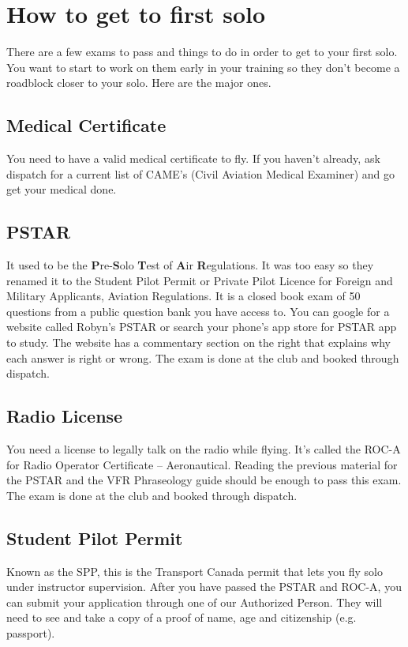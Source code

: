 \documentclass[12pt,letterpaper]{article}
\begin{document}
 \newpage
 \section{How to get to first solo}
    
    There are a few exams to pass and things to do in order to get to your first solo. You want to start to work on them early in your training so they don't become a roadblock closer to your solo. Here are the major ones.
    
    \subsection{Medical Certificate}
    You need to have a valid medical certificate to fly. If you haven't already, ask dispatch for a current list of CAME's (Civil Aviation Medical Examiner) and go get your medical done.
        
    \subsection{PSTAR}
    It used to be the \textbf{P}re-\textbf{S}olo \textbf{T}est of \textbf{A}ir \textbf{R}egulations. It was too easy so they renamed it to the Student Pilot Permit or Private Pilot Licence for Foreign and Military Applicants, Aviation Regulations. It is a closed book exam of 50 questions from a public question bank you have access to. You can google for a website called Robyn's PSTAR or search your phone's app store for PSTAR app to study. The website has a commentary section on the right that explains why each answer is right or wrong. The exam is done at the club and booked through dispatch.
        
    \subsection{Radio License}
    You need a license to legally talk on the radio while flying. It's called the ROC-A for Radio Operator Certificate -- Aeronautical. Reading the previous material for the PSTAR and the VFR Phraseology guide should be enough to pass this exam. The exam is done at the club and booked through dispatch.

    \subsection{Student Pilot Permit}
    Known as the SPP, this is the Transport Canada permit that lets you fly solo under instructor supervision. After you have passed the PSTAR and ROC-A, you can submit your application through one of our Authorized Person. They will need to see and take a copy of a proof of name, age and citizenship (e.g. passport).
    
\end{document}
